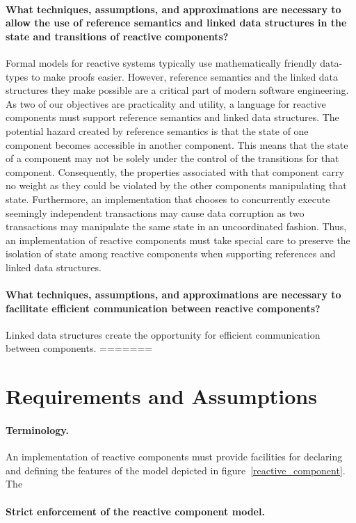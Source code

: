 \paragraph{What techniques, assumptions, and approximations are necessary to allow the use of reference semantics and linked data structures in the state and transitions of reactive components?}
Formal models for reactive systems typically use mathematically friendly data-types to make proofs easier.
However, reference semantics and the linked data structures they make possible are a critical part of modern software engineering.
As two of our objectives are practicality and utility, a language for reactive components must support reference semantics and linked data structures.
The potential hazard created by reference semantics is that the state of one component becomes accessible in another component.
This means that the state of a component may not be solely under the control of the transitions for that component.
Consequently, the properties associated with that component carry no weight as they could be violated by the other components manipulating that state.
Furthermore, an implementation that chooses to concurrently execute seemingly independent transactions may cause data corruption as two transactions may manipulate the same state in an uncoordinated fashion.
Thus, an implementation of reactive components must take special care to preserve the isolation of state among reactive components when supporting references and linked data structures.

\paragraph{What techniques, assumptions, and approximations are necessary to facilitate efficient communication between reactive components?}
Linked data structures create the opportunity for efficient communication between components.
=======
\section{Requirements and Assumptions}
\paragraph{Terminology.}
An implementation of reactive components must provide facilities for declaring and defining the features of the model depicted in figure~\ref{reactive_component}.
The

\paragraph{Strict enforcement of the reactive component model.}

